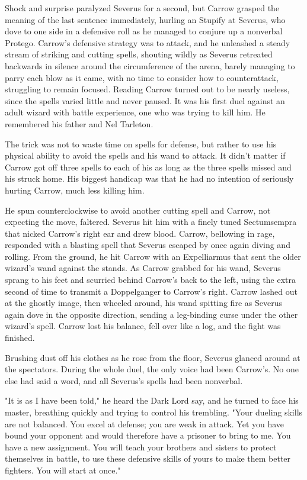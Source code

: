 \documentclass[a4paper,11pt]{article}
\begin{document}
Shock and surprise paralyzed Severus for a second, but Carrow grasped the meaning of the last sentence immediately, hurling an Stupify at Severus, who dove to one side in a defensive roll as he managed to conjure up a nonverbal Protego. Carrow's defensive strategy was to attack, and he unleashed a steady stream of striking and cutting spells, shouting wildly as Severus retreated backwards in silence around the circumference of the arena, barely managing to parry each blow as it came, with no time to consider how to counterattack, struggling to remain focused. Reading Carrow turned out to be nearly useless, since the spells varied little and never paused. It was his first duel against an adult wizard with battle experience, one who was trying to kill him. He remembered his father and Nel Tarleton.

The trick was not to waste time on spells for defense, but rather to use his physical ability to avoid the spells and his wand to attack. It didn't matter if Carrow got off three spells to each of his as long as the three spells missed and his struck home. His biggest handicap was that he had no intention of seriously hurting Carrow, much less killing him.

He spun counterclockwise to avoid another cutting spell and Carrow, not expecting the move, faltered. Severus hit him with a finely tuned Sectumsempra that nicked Carrow's right ear and drew blood. Carrow, bellowing in rage, responded with a blasting spell that Severus escaped by once again diving and rolling. From the ground, he hit Carrow with an Expelliarmus that sent the older wizard's wand against the stands. As Carrow grabbed for his wand, Severus sprang to his feet and scurried behind Carrow's back to the left, using the extra second of time to transmit a Doppelganger to Carrow's right. Carrow lashed out at the ghostly image, then wheeled around, his wand spitting fire as Severus again dove in the opposite direction, sending a leg-binding curse under the other wizard's spell. Carrow lost his balance, fell over like a log, and the fight was finished.

Brushing dust off his clothes as he rose from the floor, Severus glanced around at the spectators. During the whole duel, the only voice had been Carrow's. No one else had said a word, and all Severus's spells had been nonverbal.

"It is as I have been told," he heard the Dark Lord say, and he turned to face his master, breathing quickly and trying to control his trembling. "Your dueling skills are not balanced. You excel at defense; you are weak in attack. Yet you have bound your opponent and would therefore have a prisoner to bring to me. You have a new assignment. You will teach your brothers and sisters to protect themselves in battle, to use these defensive skills of yours to make them better fighters. You will start at once."
\end{document}
